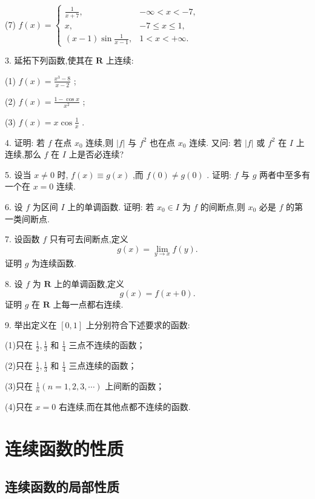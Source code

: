(7) \(f\left( x\right)  = \left\{  \begin{matrix} \frac{1}{x + 7}, &  - \infty  < x <  - 7, \\  x, &  - 7 \leq  x \leq  1, \\  \left( {x - 1}\right) \sin \frac{1}{x - 1}, & 1 < x <  + \infty . \end{matrix}\right.\)

3. 延拓下列函数,使其在 \(\mathbf{R}\) 上连续:

(1) \(f\left( x\right)  = \frac{{x}^{3} - 8}{x - 2}\) ;

(2) \(f\left( x\right)  = \frac{1 - \cos x}{{x}^{2}}\) ;

(3) \(f\left( x\right)  = x\cos \frac{1}{x}\) .

4. 证明: 若 \(f\) 在点 \({x}_{0}\) 连续,则 \(\left| f\right|\) 与 \({f}^{2}\) 也在点 \({x}_{0}\) 连续. 又问: 若 \(\left| f\right|\) 或 \({f}^{2}\) 在 \(I\) 上连续,那么 \(f\) 在 \(I\) 上是否必连续?

5. 设当 \(x \neq  0\) 时, \(f\left( x\right)  \equiv  g\left( x\right)\) ,而 \(f\left( 0\right)  \neq  g\left( 0\right)\) . 证明: \(f\) 与 \(g\) 两者中至多有一个在 \(x = 0\) 连续.

6. 设 \(f\) 为区间 \(I\) 上的单调函数. 证明: 若 \({x}_{0} \in  I\) 为 \(f\) 的间断点,则 \({x}_{0}\) 必是 \(f\) 的第一类间断点.

7. 设函数 \(f\) 只有可去间断点,定义
\[
g\left( x\right)  = \mathop{\lim }\limits_{{y \rightarrow  x}}f\left( y\right) .
\]
证明 \(g\) 为连续函数.

8. 设 \(f\) 为 \(\mathbf{R}\) 上的单调函数,定义
\[
g\left( x\right)  = f\left( {x + 0}\right) .
\]
证明 \(g\) 在 \(\mathbf{R}\) 上每一点都右连续.

9. 举出定义在 \(\left\lbrack  {0,1}\right\rbrack\) 上分别符合下述要求的函数:

(1)只在 \(\frac{1}{2},\frac{1}{3}\) 和 \(\frac{1}{4}\) 三点不连续的函数；

(2)只在 \(\frac{1}{2},\frac{1}{3}\) 和 \(\frac{1}{4}\) 三点连续的函数；

(3)只在 \(\frac{1}{n}\left( {n = 1,2,3,\cdots }\right)\) 上间断的函数；

(4)只在 \(x = 0\) 右连续,而在其他点都不连续的函数.

\section{连续函数的性质}

\subsection{连续函数的局部性质}

